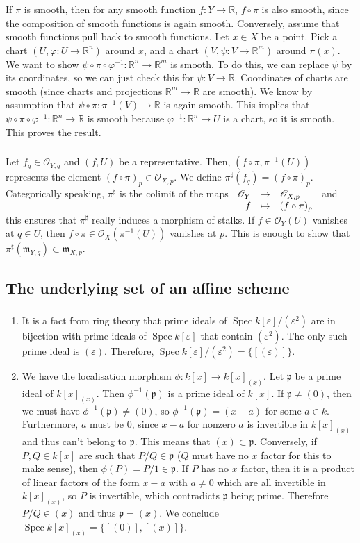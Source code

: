 \documentclass{article}
\newcommand{\R}{\mathbb{R}}
\DeclareMathOperator{\Spec}{Spec}
\renewcommand{\epsilon}{\varepsilon}
\newcommand{\applic}[4]{\begin{array}[t]{rcl}
#1 & \to & #2 \\
#3 & \mapsto & #4
\end{array}}
\newcommand{\Osheaf}{\mathscr{O}}
\newcommand{\m}{\mathfrak{m}}
\newcommand{\exercise}{\subsubsection} %
\begin{document}
\exercise{} If $\pi$ is smooth, then for any smooth function $f : Y \to \R$, $f \circ \pi$ is also smooth, since the composition of smooth functions is again smooth. Conversely, assume that smooth functions pull back to smooth functions. Let $x \in X$ be a point. Pick a chart $(U,\varphi : U \to \R^n)$ around $x$, and a chart $(V,\psi : V \to \R^m)$ around $\pi(x)$. We want to show $\psi \circ \pi \circ \varphi^{-1} : \R^n \to \R^m$ is smooth. To do this, we can replace $\psi$ by its coordinates, so we can just check this for $\psi : V \to \R$. Coordinates of charts are smooth (since charts and projections $\R^m \to \R$ are smooth). We know by assumption that $\psi \circ \pi : \pi^{-1}(V) \to \R$ is again smooth. This implies that $\psi \circ \pi \circ \varphi^{-1} : \R^n \to \R$ is smooth because $\varphi^{-1} : \R^n\to U$ is a chart, so it is smooth. This proves the result.

\exercise{} Let $f_q \in \Osheaf_{Y,q}$ and $(f,U)$ be a representative. Then, $(f\circ \pi, \pi^{-1}(U))$ represents the element $(f\circ \pi)_p \in \Osheaf_{X,p}$. We define $\pi^\sharp (f_q) = (f \circ \pi)_p$. Categorically speaking, $\pi^\sharp$ is the colimit of the maps $\applic{\Osheaf_Y}{\Osheaf_{X,p}}{f}{(f\circ \pi)_p}$ and this ensures that $\pi^\sharp$ really induces a morphism of stalks. If $f \in \Osheaf_Y(U)$ vanishes at $q \in U$, then $f \circ \pi \in \Osheaf_X (\pi^{-1}(U))$ vanishes at $p$. This is enough to show that $\pi^\sharp (\m_{Y,q}) \subset \m_{X,p}$.

\subsection{The underlying set of an affine scheme}

\exercise{} \label{spec_local_en_x}
\begin{enumerate}
    \item It is a fact from ring theory that prime ideals of $\Spec k[\varepsilon]/(\epsilon^2)$ are in bijection with prime ideals of $\Spec k[\varepsilon]$ that contain $(\epsilon^2)$. The only such prime ideal is $(\varepsilon)$. Therefore, $\Spec k[\varepsilon]/(\epsilon^2) = \{[(\varepsilon)]\}$.
    \item We have the localisation morphism $\phi : k[x] \to k[x]_{(x)}$. Let $\mathfrak{p}$ be a prime ideal of $k[x]_{(x)}$. Then $\phi^{-1}(\mathfrak{p})$ is a prime ideal of $k[x]$. If $\mathfrak{p} \ne (0)$, then we must have $\phi^{-1}(\mathfrak{p}) \ne (0)$, so $\phi^{-1}(\mathfrak{p}) = (x-a)$ for some $a \in k$. Furthermore, $a$ must be $0$, since $x-a$ for nonzero $a$ is invertible in $k[x]_{(x)}$ and thus can't belong to $\mathfrak{p}$. This means that $(x) \subset \mathfrak{p}$. Conversely, if $P,Q \in k[x]$ are such that $P/Q \in \mathfrak{p}$ ($Q$ must have no $x$ factor for this to make sense), then $\phi(P) = P/1 \in \mathfrak{p}$. If $P$ has no $x$ factor, then it is a product of linear factors of the form $x-a$ with $a\ne 0$ which are all invertible in $k[x]_{(x)}$, so $P$ is invertible, which contradicts $\mathfrak{p}$ being prime. Therefore $P/Q \in (x)$ and thus $\mathfrak{p} = (x)$. We conclude $\Spec k[x]_{(x)} = \{[(0)], [(x)]\}$.
\end{enumerate}
\end{document}
